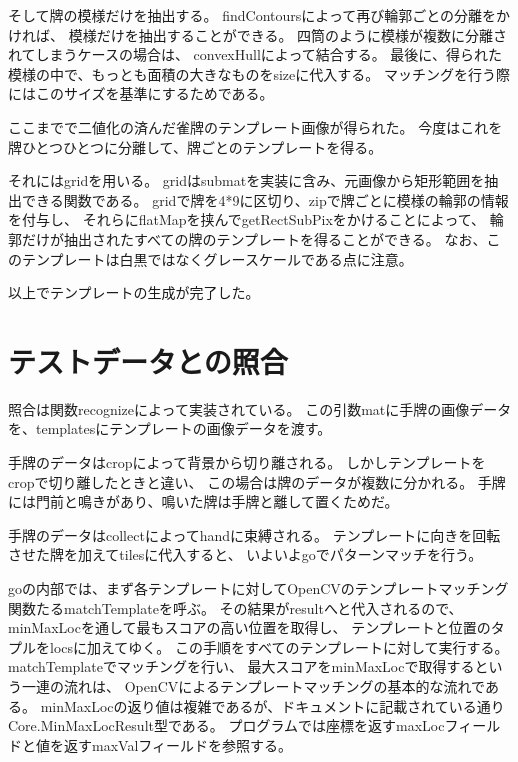\documentclass{jsarticle}
\begin{document}
\begin{multicols}{2}
そして牌の模様だけを抽出する。
findContoursによって再び輪郭ごとの分離をかければ、
模様だけを抽出することができる。
四筒のように模様が複数に分離されてしまうケースの場合は、
convexHullによって結合する。
最後に、得られた模様の中で、もっとも面積の大きなものをsizeに代入する。
マッチングを行う際にはこのサイズを基準にするためである。

ここまでで二値化の済んだ雀牌のテンプレート画像が得られた。
今度はこれを牌ひとつひとつに分離して、牌ごとのテンプレートを得る。

それにはgridを用いる。
gridはsubmatを実装に含み、元画像から矩形範囲を抽出できる関数である。
gridで牌を4*9に区切り、zipで牌ごとに模様の輪郭の情報を付与し、
それらにflatMapを挟んでgetRectSubPixをかけることによって、
輪郭だけが抽出されたすべての牌のテンプレートを得ることができる。
なお、このテンプレートは白黒ではなくグレースケールである点に注意。

以上でテンプレートの生成が完了した。

\section{テストデータとの照合}

照合は関数recognizeによって実装されている。
この引数matに手牌の画像データを、templatesにテンプレートの画像データを渡す。

手牌のデータはcropによって背景から切り離される。
しかしテンプレートをcropで切り離したときと違い、
この場合は牌のデータが複数に分かれる。
手牌には門前と鳴きがあり、鳴いた牌は手牌と離して置くためだ。

手牌のデータはcollectによってhandに束縛される。
テンプレートに向きを回転させた牌を加えてtilesに代入すると、
いよいよgoでパターンマッチを行う。

\begin{comment}
collectはfilterとmapを合わせたような関数
条件を満たした結果のみのシーケンスを作る
条件文はcase(hand,contour) if hand.size.area>0
だがこれでは何の条件判定をしているのか？
\end{comment}
	
goの内部では、まず各テンプレートに対してOpenCVのテンプレートマッチング関数たるmatchTemplateを呼ぶ。
その結果がresultへと代入されるので、
minMaxLocを通して最もスコアの高い位置を取得し、
テンプレートと位置のタプルをlocsに加えてゆく。
この手順をすべてのテンプレートに対して実行する。
matchTemplateでマッチングを行い、
最大スコアをminMaxLocで取得するという一連の流れは、
OpenCVによるテンプレートマッチングの基本的な流れである。
minMaxLocの返り値は複雑であるが、ドキュメントに記載されている\cite{minMaxLoc}通り
Core.MinMaxLocResult型である。
プログラムでは座標を返すmaxLocフィールドと値を返すmaxValフィールドを参照する。


\end{multicols}
\end{document}
